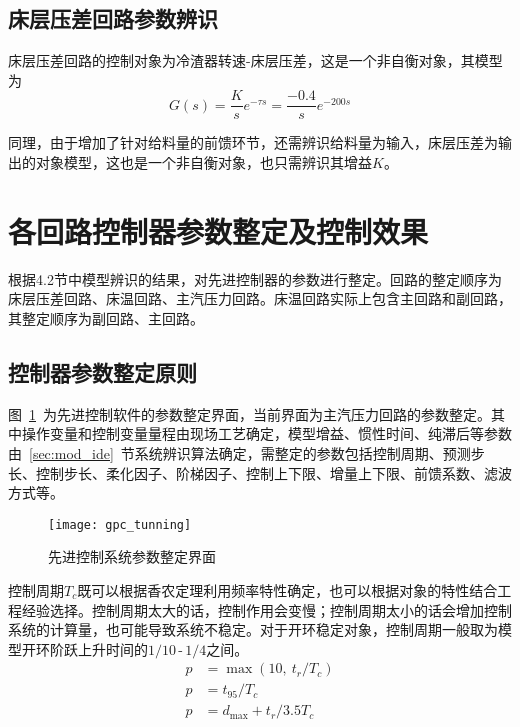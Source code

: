  
\subsection{床层压差回路参数辨识}
床层压差回路的控制对象为冷渣器转速-床层压差，这是一个非自衡对象，其模型为
\begin{equation}
\label{equ:tans_func}
G(s) = \frac{K}{s}e^{-\tau{s}} = \frac{-0.4}{s}e^{-200{s}}
\end{equation}
 
同理，由于增加了针对给料量的前馈环节，还需辨识给料量为输入，床层压差为输出的对象模型，这也是一个非自衡对象，也只需辨识其增益$K$。


\section{各回路控制器参数整定及控制效果}
根据4.2节中模型辨识的结果，对先进控制器的参数进行整定。回路的整定顺序为床层压差回路、床温回路、主汽压力回路。床温回路实际上包含主回路和副回路，其整定顺序为副回路、主回路。

\subsection{控制器参数整定原则}

图~\ref{fig:gpc_tunning}~为先进控制软件的参数整定界面，当前界面为主汽压力回路的参数整定。其中操作变量和控制变量量程由现场工艺确定，模型增益、惯性时间、纯滞后等参数由~\ref{sec:mod_ide}~节系统辨识算法确定，需整定的参数包括控制周期、预测步长、控制步长、柔化因子、阶梯因子、控制上下限、增量上下限、前馈系数、滤波方式等。
\begin{figure}[!htb]
\centering
\texttt{[image: gpc\_tunning]}
\caption{先进控制系统参数整定界面} \label{fig:gpc_tunning}
\end{figure}

控制周期$T_{c}$既可以根据香农定理利用频率特性确定，也可以根据对象的特性结合工程经验选择。控制周期太大的话，控制作用会变慢；控制周期太小的话会增加控制系统的计算量，也可能导致系统不稳定。对于开环稳定对象，控制周期一般取为模型开环阶跃上升时间的$\textrm{1}/\textrm{10}$\,-\,$\textrm{1}/\textrm{4}$之间。
\begin{subequations}
\begin{align}
p &= \max{(10,\ t_{r}/T_{c})} \label{equ:steady1}\\
p &= t_{95}/T_{c} \label{equ:steady2}\\
p &= d_{\max}+t_{r}/\textrm{3.5}T_{c} \label{equ:with_dealy}
\end{align}
\end{subequations}

